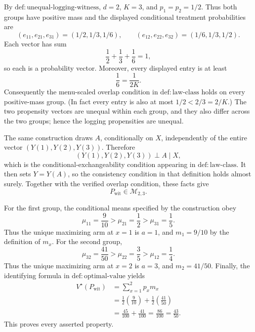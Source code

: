 By \(\mathrm{def{:}unequal\text{-}logging\text{-}witness}\), \(d=2\), \(K=3\), and \(p_1=p_2=1/2\).  Thus both groups have positive mass and the displayed conditional treatment probabilities are
\[
(e_{11},e_{21},e_{31})=(1/2,1/3,1/6),
\qquad
(e_{12},e_{22},e_{32})=(1/6,1/3,1/2).
\]
Each vector has sum
\[
\frac12+\frac13+\frac16=1,
\]
so each is a probability vector.  Moreover, every displayed entry is at least
\[
\frac16=\frac{1}{2K}.
\]
Consequently the menu-scaled overlap condition in \(\mathrm{def{:}law\text{-}class}\) holds on every positive-mass group.  (In fact every entry is also at most \(1/2<2/3=2/K\).)  The two propensity vectors are unequal within each group, and they also differ across the two groups; hence the logging propensities are unequal.

The same construction draws \(A\), conditionally on \(X\), independently of the entire vector \((Y(1),Y(2),Y(3))\).  Therefore
\[
(Y(1),Y(2),Y(3))\mathrel{\perp}A\mid X,
\]
which is the conditional-exchangeability condition appearing in \(\mathrm{def{:}law\text{-}class}\).  It then sets \(Y=Y(A)\), so the consistency condition in that definition holds almost surely.  Together with the verified overlap condition, these facts give
\[
P_{\mathrm{wit}}\in\mathcal M_{2,3}.
\]

For the first group, the conditional means specified by the construction obey
\[
\mu_{11}=\frac9{10}>\mu_{21}=\frac12>\mu_{31}=\frac15.
\]
Thus the unique maximizing arm at \(x=1\) is \(a=1\), and \(m_1=9/10\) by the definition of \(m_x\).  For the second group,
\[
\mu_{32}=\frac{41}{50}>\mu_{22}=\frac35>\mu_{12}=\frac14.
\]
Thus the unique maximizing arm at \(x=2\) is \(a=3\), and \(m_2=41/50\).  Finally, the identifying formula in \(\mathrm{def{:}optimal\text{-}value}\) yields
\[
\begin{aligned}
V^\star(P_{\mathrm{wit}})
  &=\sum_{x=1}^{2}p_xm_x \\
  &=\frac12\left(\frac9{10}\right)
    +\frac12\left(\frac{41}{50}\right) \\
  &=\frac{45}{100}+\frac{41}{100}
   =\frac{86}{100}
   =\frac{43}{50}.
\end{aligned}
\]
This proves every asserted property.
